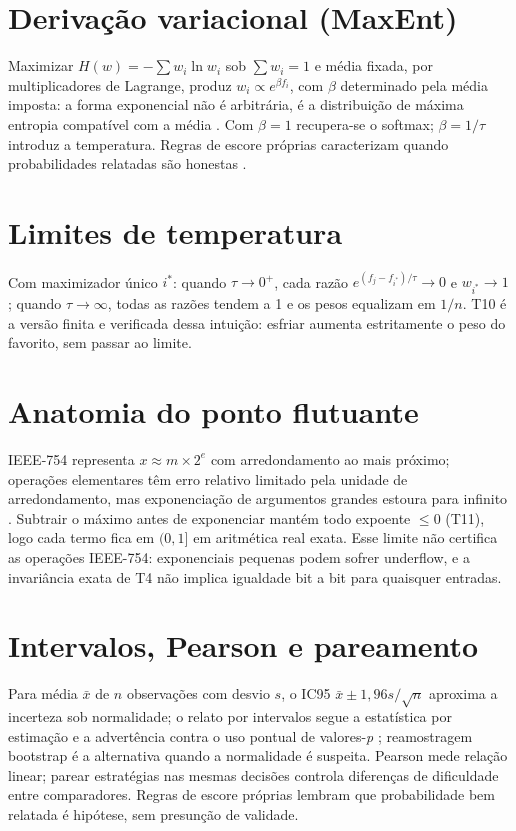 \section{Derivação variacional (MaxEnt)}
Maximizar $H(w)=-\sum w_i\ln w_i$ sob $\sum w_i=1$ e média fixada, por multiplicadores de Lagrange, produz $w_i\propto e^{\beta f_i}$, com $\beta$ determinado pela média imposta: a forma exponencial não é arbitrária, é a distribuição de máxima entropia compatível com a média \cite{jaynes1957,shannon1948}. Com $\beta=1$ recupera-se o softmax; $\beta=1/\tau$ introduz a temperatura. Regras de escore próprias caracterizam quando probabilidades relatadas são honestas \cite{gneiting2007}.
\section{Limites de temperatura}
Com maximizador único $i^*$: quando $\tau\to0^+$, cada razão $e^{(f_j-f_{i^*})/\tau}\to0$ e $w_{i^*}\to1$; quando $\tau\to\infty$, todas as razões tendem a 1 e os pesos equalizam em $1/n$. T10 é a versão finita e verificada dessa intuição: esfriar aumenta estritamente o peso do favorito, sem passar ao limite.
\section{Anatomia do ponto flutuante}
IEEE-754 representa $x\approx m\times2^e$ com arredondamento ao mais próximo; operações elementares têm erro relativo limitado pela unidade de arredondamento, mas exponenciação de argumentos grandes estoura para infinito \cite{goldberg1991,muller2018}. Subtrair o máximo antes de exponenciar mantém todo expoente $\leq0$ (T11), logo cada termo fica em $(0,1]$ em aritmética real exata. Esse limite não certifica as operações IEEE-754: exponenciais pequenas podem sofrer underflow, e a invariância exata de T4 não implica igualdade bit a bit para quaisquer entradas.
\section{Intervalos, Pearson e pareamento}
Para média $\bar{x}$ de $n$ observações com desvio $s$, o IC95 $\bar{x}\pm1{,}96s/\sqrt{n}$ aproxima a incerteza sob normalidade; o relato por intervalos segue a estatística por estimação \cite{cumming2014} e a advertência contra o uso pontual de valores-\textit{p} \cite{wasserstein2016}; reamostragem bootstrap \cite{efron1979} é a alternativa quando a normalidade é suspeita. Pearson mede relação linear; parear estratégias nas mesmas decisões controla diferenças de dificuldade entre comparadores. Regras de escore próprias \cite{gneiting2007} lembram que probabilidade bem relatada é hipótese, sem presunção de validade.
